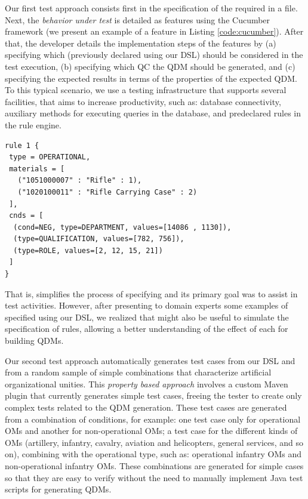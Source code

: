 Our first test approach consists first in the specification of the required \callers in a \hlrdsl
file. Next, the \emph{behavior under test} is detailed as features using
the Cucumber~\cite{wynne2017cucumber} framework (we present an 
example of a feature in Listing \ref{code:cucumber}). After that, the developer details 
the implementation steps of the features by (a) specifying which \callers
(previously declared using our DSL) should be considered 
in the test execution, (b) specifying which QC the QDM should be generated,
and (c) specifying the expected results in terms of the properties of the expected QDM. 
To this typical scenario, we use a testing  infrastructure that supports several facilities,
that aims to increase productivity, such as: database connectivity,
auxiliary methods for executing queries in the database, and predeclared rules in the rule engine.

\begin{small}
\begin{lstlisting}[frame=single, language=DSL, caption={\it Example of a \shc declaration using our DSL}, label={code:dslExample}]
rule 1 { 
 type = OPERATIONAL, 
 materials = [ 
   ("1051000007" : "Rifle" : 1), 
   ("1020100011" : "Rifle Carrying Case" : 2)
 ], 
 cnds = [ 
  (cond=NEG, type=DEPARTMENT, values=[14086 , 1130]),
  (type=QUALIFICATION, values=[782, 756]), 
  (type=ROLE, values=[2, 12, 15, 21])
 ]
}
\end{lstlisting}
\end{small}


That is, \hlrdsl simplifies the process of specifying \callers and its primary goal was to 
assist in test activities. However, after presenting to domain experts some examples of \callers specified using 
our DSL, we realized that \hlrdsl might also be useful  
to simulate the specification of rules, allowing a better understanding of the effect of each 
\shc for building QDMs.




Our second test approach automatically generates test cases 
from our DSL and from a random sample of simple combinations that
characterize artificial organizational unities. This \emph{property
based approach} involves a custom Maven plugin that currently generates simple test cases, 
freeing the tester to create only complex tests related to the QDM generation. 
These test cases are generated from a combination of conditions, for example:
one test case only for operational OMs 
and another for non-operational OMs; a test case for the different kinds of OMs (artillery, infantry,
cavalry, aviation and helicopters, general services, and so on), combining with the operational type, 
such as: operational infantry OMs and non-operational infantry OMs. These combinations are generated for simple 
cases so that they are easy to verify without the need to manually implement
Java test scripts for generating QDMs. 

